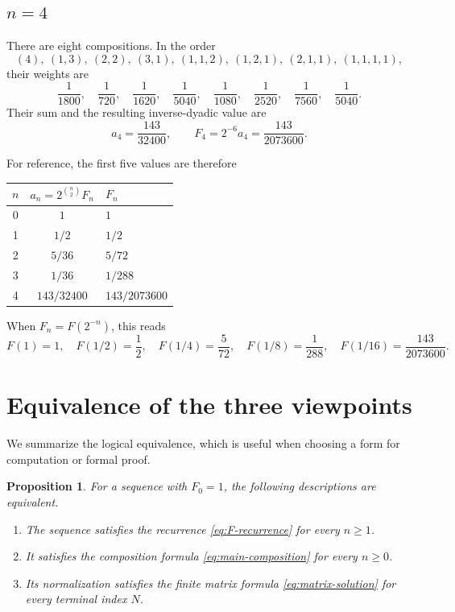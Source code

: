 \documentclass[11pt]{article}
\newtheorem{proposition}[theorem]{Proposition}
\theoremstyle{definition}
\theoremstyle{remark}
\begin{document}
\subsection*{$n=4$}

There are eight compositions.  In the order
\[
 (4),\ (1,3),\ (2,2),\ (3,1),\
 (1,1,2),\ (1,2,1),\ (2,1,1),\ (1,1,1,1),
\]
their weights are
\[
 \frac1{1800},\quad \frac1{720},\quad \frac1{1620},\quad
 \frac1{5040},\quad \frac1{1080},\quad \frac1{2520},\quad
 \frac1{7560},\quad \frac1{5040}.
\]
Their sum and the resulting inverse-dyadic value are
\[
 a_4=\frac{143}{32400},
 \qquad
 F_4=2^{-6}a_4=\frac{143}{2073600}.
\]

For reference, the first five values are therefore
\begin{center}
\begin{tabular}{@{}ccl@{}}
\toprule
$n$ & $a_n=2^{\binom n2}F_n$ & $F_n$ \\
\midrule
0 & $1$ & $1$ \\
1 & $1/2$ & $1/2$ \\
2 & $5/36$ & $5/72$ \\
3 & $1/36$ & $1/288$ \\
4 & $143/32400$ & $143/2073600$ \\
\bottomrule
\end{tabular}
\end{center}

When $F_n=F(2^{-n})$, this reads
\[
 F(1)=1,\quad F(1/2)=\frac12,\quad F(1/4)=\frac5{72},
 \quad F(1/8)=\frac1{288},\quad
 F(1/16)=\frac{143}{2073600}.
\]

\section{Equivalence of the three viewpoints}

We summarize the logical equivalence, which is useful when choosing a form
for computation or formal proof.

\begin{proposition}\label{prop:equivalence}
For a sequence with $F_0=1$, the following descriptions are equivalent.
\begin{enumerate}
\item The sequence satisfies the recurrence \eqref{eq:F-recurrence} for
      every $n\geq1$.
\item It satisfies the composition formula \eqref{eq:main-composition} for
      every $n\geq0$.
\item Its normalization satisfies the finite matrix formula
      \eqref{eq:matrix-solution} for every terminal index $N$.
\end{enumerate}
\end{proposition}
\end{document}
